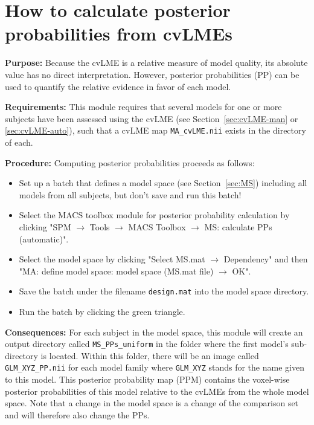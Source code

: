 \documentclass[a4paper,12pt]{article}
\newcommand{\ra}{$\rightarrow$ }
\begin{document}
\pagebreak
\section{How to calculate posterior probabilities from cvLMEs} \label{sec:PP}

\textbf{Purpose:} Because the cvLME is a relative measure of model quality, its absolute value has no direct interpretation. However, posterior probabilities (PP) can be used to quantify the relative evidence in favor of each model.

\textbf{Requirements:} This module requires that several models for one or more subjects have been assessed using the cvLME (see Section~\ref{sec:cvLME-man} or \ref{sec:cvLME-auto}), such that a cvLME map \texttt{MA\_cvLME.nii} exists in the directory of each.

\textbf{Procedure:} Computing posterior probabilities proceeds as follows:
\begin{itemize}

\item
Set up a batch that defines a model space (see Section~\ref{sec:MS}) including all models from all subjects, but don't save and run this batch!

\item
Select the MACS toolbox module for posterior probability calculation by clicking \linebreak[4] "SPM \ra Tools \ra MACS Toolbox \ra MS: calculate PPs (automatic)".

\item
Select the model space by clicking "Select MS.mat \ra Dependency" and then \linebreak[4] "MA: define model space: model space (MS.mat file) \ra OK".

\item
Save the batch under the filename \texttt{design.mat} into the model space directory.

\item
Run the batch by clicking the green triangle.
	
\end{itemize}

\textbf{Consequences:} For each subject in the model space, this module will create an output directory called \texttt{MS\_PPs\_uniform} in the folder where the first model's sub-directory is located. Within this folder, there will be an image called \texttt{GLM\_XYZ\_PP.nii} for each model family where \texttt{GLM\_XYZ} stands for the name given to this model. This posterior probability map (PPM) contains the voxel-wise posterior probabilities of this model relative to the cvLMEs from the whole model space. Note that a change in the model space is a change of the comparison set and will therefore also change the PPs.
\end{document}
